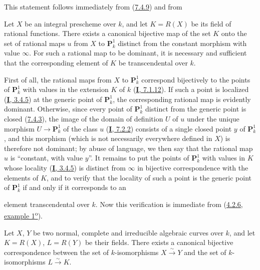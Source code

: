 This statement follows immediately from (\hyperref[II.7.4.9]{7.4.9}) and
from

\begin{lemma}[7.4.15.1]
\label{II.7.4.15.1}
Let $X$ be an integral prescheme over $k$, and let $K=R(X)$ be its field of
rational functions. There exists a canonical bijective map of the set
$K$ onto the set of rational maps $u$ from $X$ to
$\mathbf{P}_k^1$ distinct from the constant morphism with value $\infty$. For
such a rational map to be dominant, it is necessary and sufficient that the
corresponding element of $K$ be transcendental over $k$.
\end{lemma}

First of all, the rational maps from $X$ to $\mathbf{P}_k^1$
correspond bijectively to the points of $\mathbf{P}_k^1$ with values in
the extension $K$ of $k$ (\hyperref[I.7.1.12]{\textbf{I}, 7.1.12}). If such a point
is localized (\hyperref[I.3.4.5]{\textbf{I}, 3.4.5}) at the generic point of
$\mathbf{P}_k^1$, the corresponding rational map is evidently
dominant. Otherwise, since every point of $\mathbf{P}_k^1$
distinct from the generic point is closed (\hyperref[II.7.4.3]{7.4.3}),
the image of the domain of definition $U$ of $u$ under the unique morphism
$U\to\mathbf{P}_k^1$ of the class $u$ (\hyperref[I.7.2.2]{\textbf{I}, 7.2.2})
consists of a single closed point $y$ of $\mathbf{P}_k^1$, and this morphism
(which is not necessarily everywhere defined in $X$) is therefore not dominant;
by abuse of language, we then say that the rational map $u$ is
``constant, with value $y$''. It remains to put the points of
$\mathbf{P}_k^1$ with values in $K$ whose locality
(\hyperref[I.3.4.5]{\textbf{I}, 3.4.5}) is distinct from $\infty$ in bijective
correspondence with the elements of $K$, and to verify that the locality of
such a point is the generic point of $\mathbf{P}_k^1$ if and only if it
corresponds to an

element transcendental over $k$. Now this verification is immediate from
(\hyperref[II.4.2.6]{4.2.6, example 1\textsuperscript{o}}).

\begin{corollary}[7.4.16]
\label{II.7.4.16}
Let $X$, $Y$ be two \textup{normal, complete} and irreducible algebraic curves over
$k$, and let $K=R(X)$, $L=R(Y)$ be their fields. There exists a
canonical bijective correspondence between the set of $k$-isomorphisms
$X\xrightarrow{\sim}Y$ and the set of $k$-isomorphisms
$L\xrightarrow{\sim}K$.
\end{corollary}

